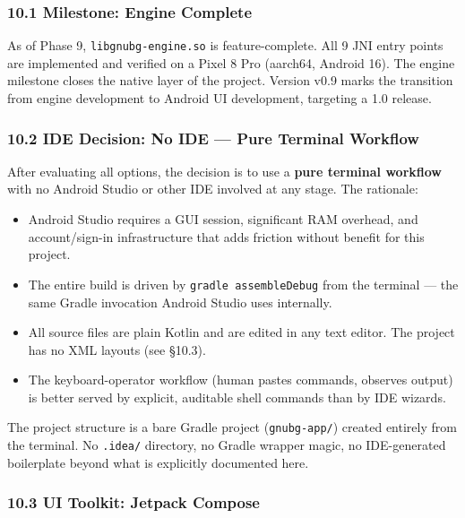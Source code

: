 \documentclass[11pt,a4paper]{article}
\providecommand{\tightlist}{\setlength{\itemsep}{2pt}\setlength{\parskip}{0pt}}
\begin{document}
\subsubsection{10.1 Milestone: Engine
Complete}\label{milestone-engine-complete}

As of Phase 9, \texttt{libgnubg-engine.so} is feature-complete. All 9
JNI entry points are implemented and verified on a Pixel 8 Pro (aarch64,
Android 16). The engine milestone closes the native layer of the project.
Version v0.9 marks the transition from engine development to Android UI
development, targeting a 1.0 release.

\subsubsection{10.2 IDE Decision: No IDE --- Pure Terminal
Workflow}\label{ide-decision-no-ide}

After evaluating all options, the decision is to use a \textbf{pure
terminal workflow} with no Android Studio or other IDE involved at any
stage. The rationale:

\begin{itemize}
\tightlist
\item
  Android Studio requires a GUI session, significant RAM overhead, and
  account/sign-in infrastructure that adds friction without benefit for
  this project.
\item
  The entire build is driven by \texttt{gradle assembleDebug} from the
  terminal --- the same Gradle invocation Android Studio uses internally.
\item
  All source files are plain Kotlin and are edited in any text editor.
  The project has no XML layouts (see §10.3).
\item
  The keyboard-operator workflow (human pastes commands, observes
  output) is better served by explicit, auditable shell commands than by
  IDE wizards.
\end{itemize}

The project structure is a bare Gradle project (\texttt{gnubg-app/})
created entirely from the terminal. No \texttt{.idea/} directory, no
Gradle wrapper magic, no IDE-generated boilerplate beyond what is
explicitly documented here.

\subsubsection{10.3 UI Toolkit: Jetpack
Compose}\label{ui-toolkit-jetpack-compose}
\end{document}
